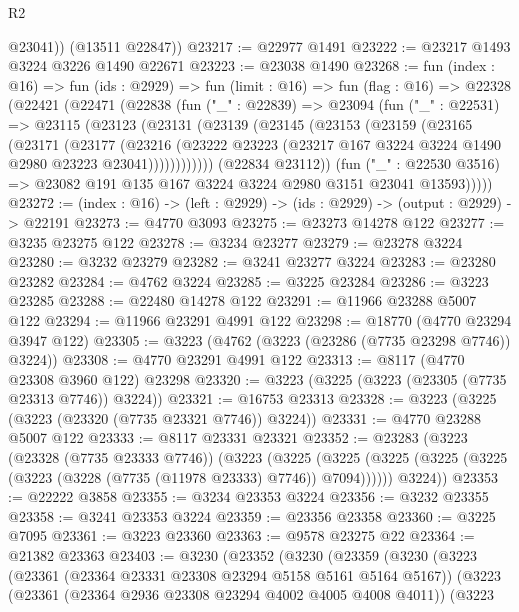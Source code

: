 \begin{lexlean}{R2}
\begin{coremodule}
          @23041))
      (@13511 @22847))
@23217 := @22977 @1491
@23222 := @23217 @1493 @3224 @3226 @1490 @22671
@23223 := @23038 @1490
@23268 := fun (index : @16) =>
  fun (ids : @2929) =>
  fun (limit : @16) =>
  fun (flag : @16) =>
  @22328
    (@22421
      (@22471
        (@22838
          (fun ("_" : @22839) =>
          @23094
            (fun ("_" : @22531) =>
            @23115
              (@23123
                (@23131
                  (@23139
                    (@23145
                      (@23153
                        (@23159
                          (@23165
                            (@23171
                              (@23177
                                (@23216
                                  (@23222
                                    @23223
                                    (@23217 @167 @3224 @3224 @1490 @2980 @23223 @23041))))))))))))
              (@22834 @23112))
            (fun ("_" : @22530 @3516) =>
            @23082 @191 @135 @167 @3224 @3224 @2980 @3151 @23041 @13593)))))
@23272 := (index : @16) -> (left : @2929) -> (ids : @2929) -> (output : @2929) -> @22191
@23273 := @4770 @3093
@23275 := @23273 @14278 @122
@23277 := @3235 @23275 @122
@23278 := @3234 @23277
@23279 := @23278 @3224
@23280 := @3232 @23279
@23282 := @3241 @23277 @3224
@23283 := @23280 @23282
@23284 := @4762 @3224
@23285 := @3225 @23284
@23286 := @3223 @23285
@23288 := @22480 @14278 @122
@23291 := @11966 @23288 @5007 @122
@23294 := @11966 @23291 @4991 @122
@23298 := @18770 (@4770 @23294 @3947 @122)
@23305 := @3223 (@4762 (@3223 (@23286 (@7735 @23298 @7746)) @3224))
@23308 := @4770 @23291 @4991 @122
@23313 := @8117 (@4770 @23308 @3960 @122) @23298
@23320 := @3223 (@3225 (@3223 (@23305 (@7735 @23313 @7746)) @3224))
@23321 := @16753 @23313
@23328 := @3223 (@3225 (@3223 (@23320 (@7735 @23321 @7746)) @3224))
@23331 := @4770 @23288 @5007 @122
@23333 := @8117 @23331 @23321
@23352 := @23283
    (@3223
      (@23328 (@7735 @23333 @7746))
      (@3223
        (@3225 (@3225 (@3225 (@3225 (@3225 (@3223 (@3228 (@7735 (@11978 @23333) @7746)) @7094))))))
        @3224))
@23353 := @22222 @3858
@23355 := @3234 @23353 @3224
@23356 := @3232 @23355
@23358 := @3241 @23353 @3224
@23359 := @23356 @23358
@23360 := @3225 @7095
@23361 := @3223 @23360
@23363 := @9578 @23275 @22
@23364 := @21382 @23363
@23403 := @3230
    (@23352
      (@3230
        (@23359
          (@3230
            (@3223
              (@23361 (@23364 @23331 @23308 @23294 @5158 @5161 @5164 @5167))
              (@3223
                (@23361 (@23364 @2936 @23308 @23294 @4002 @4005 @4008 @4011))
                (@3223

\end{coremodule}
\end{lexlean}
